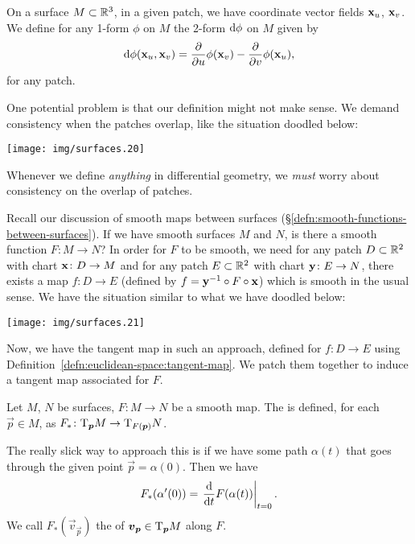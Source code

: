 \begin{definition}
On a surface $M\subset\mathbb{R}^{3}$, in a given patch, we have coordinate
vector fields $\mathbf{x}_{u}$, $\mathbf{x}_{v}$. We define for any 1-form
$\phi$ on $M$ the 2-form $\mathrm{d}\phi$ on $M$ given by
\begin{equation}
\mathrm{d}\phi(\mathbf{x}_{u}, \mathbf{x}_{v}) = \frac{\partial}{\partial u}\phi(\mathbf{x}_{v})-
\frac{\partial}{\partial v}\phi(\mathbf{x}_{u}),
\end{equation}
for any patch.
\end{definition}


One potential problem is that our definition might not make sense. We
demand consistency when the patches overlap, like the situation doodled
below:
\begin{center}
  \texttt{[image: img/surfaces.20]}
\end{center}
Whenever we define \emph{anything} in differential geometry, we
\emph{must} worry about consistency on the overlap of patches.

\vfill\eject
{}
Recall our discussion of smooth maps between surfaces
(\S\ref{defn:smooth-functions-between-surfaces}).
If we have smooth surfaces $M$ and $N$, is there a smooth function
$F\colon M\to N$? In order for $F$ to be smooth, we need for any patch
$D\subset\mathbb{R}^{2}$ with chart $\mathbf{x}\colon D\to M$ and for any patch
$E\subset\mathbb{R}^{2}$ with chart $\mathbf{y}\colon E\to N$, there exists a
map $f\colon D\to E$ (defined by $f=\mathbf{y}^{-1}\circ
F\circ\mathbf{x}$) which is smooth in the usual sense.
We have the situation similar to what we have doodled below:
\begin{center}
  \texttt{[image: img/surfaces.21]}
\end{center}
Now, we have the tangent map in such an approach, defined for $f\colon D\to E$
using Definition~\ref{defn:euclidean-space:tangent-map}. We patch them
together to induce a tangent map associated for $F$.

\begin{definition}
Let $M$, $N$ be surfaces, $F\colon M\to N$ be a smooth map.
The  is defined, for each $\vec{p}\in M$, as
$F_{*}\colon\mathrm{T}_{\boldsymbol{p}}M\to\mathrm{T}_{F(\boldsymbol{p})}N$.
\end{definition}

\M
The really slick way to approach this is if we have some path
$\alpha(t)$ that goes through the given point $\vec{p}=\alpha(0)$. Then
we have
\begin{equation}
F_{*}(\alpha'(0)) = \left.\frac{\mathrm{d}}{\mathrm{d} t}F(\alpha(t))\right|_{t=0}.
\end{equation}
We call $F_{*}(\vec{v}_{\vec{p}})$ the 
of $\boldsymbol{v}_{\boldsymbol{p}}\in\mathrm{T}_{\boldsymbol{p}}M$ along $F$.

